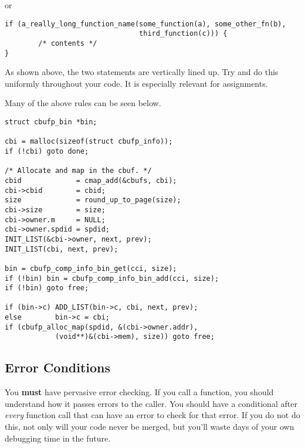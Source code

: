 \documentclass[11pt,onecolumn]{article}
\newcommand{\head}[1]{\vspace{0.4em}\noindent{\bf #1}}
\begin{document}
or

    \begin{minipage}{3in}
      \footnotesize
      \lstset{language=C}
      \begin{lstlisting}
if (a_really_long_function_name(some_function(a), some_other_fn(b),
                                third_function(c))) {
        /* contents */
}
      \end{lstlisting}
    \end{minipage}

\head{Aligned expressions.} As shown above, the two statements are
vertically lined up.  Try and do this uniformly throughout your code.
It is especially relevant for assignments.

\head{Example.}  Many of the above rules can be seen below.

    \begin{minipage}{3in}
      \footnotesize
      \lstset{language=C}
      \begin{lstlisting}
struct cbufp_bin *bin;

cbi = malloc(sizeof(struct cbufp_info));
if (!cbi) goto done;

/* Allocate and map in the cbuf. */
cbid             = cmap_add(&cbufs, cbi);
cbi->cbid        = cbid;
size             = round_up_to_page(size);
cbi->size        = size;
cbi->owner.m     = NULL;
cbi->owner.spdid = spdid;
INIT_LIST(&cbi->owner, next, prev);
INIT_LIST(cbi, next, prev);

bin = cbufp_comp_info_bin_get(cci, size);
if (!bin) bin = cbufp_comp_info_bin_add(cci, size);
if (!bin) goto free;

if (bin->c) ADD_LIST(bin->c, cbi, next, prev);
else        bin->c = cbi;
if (cbufp_alloc_map(spdid, &(cbi->owner.addr), 
		    (void**)&(cbi->mem), size)) goto free;
      \end{lstlisting}
    \end{minipage}

\subsection{Error Conditions}

You {\bf must} have pervasive error checking.  If you call a function,
you should understand how it passes errors to the caller.  You should
have a conditional after {\em every} function call that can have an
error to check for that error.  If you do not do this, not only will
your code never be merged, but you'll waste days of your own debugging
time in the future.
\end{document}
